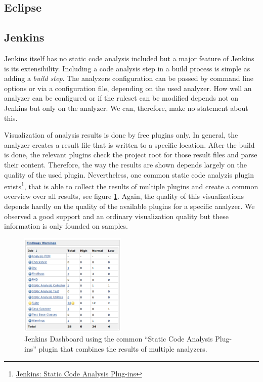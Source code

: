 \documentclass[conference]{IEEEtran}
\begin{document}
\subsection{Eclipse}
\label{subsec:evaluation_eclipse}

\subsection{Jenkins}
\label{subsec:evaluation_jenkins}
Jenkins itself has no static code analysis included but a major feature of Jenkins is its extensibility. Including a code analysis step in a build process is simple as adding a \textit{build step}. The analyzers configuration can be passed by command line options or via a configuration file, depending on the used analyzer. How well an analyzer can be configured or if the ruleset can be modified depends not on Jenkins but only on the analyzer. We can, therefore, make no statement about this.

Visualization of analysis results is done by free plugins only. In general, the analyzer creates a result file that is written to a specific location. After the build is done, the relevant plugins check the project root for those result files and parse their content. Therefore, the way the results are shown depends largely on the quality of the used plugin. Nevertheless, one common static code analyzis plugin exists\footnote{\href{https://wiki.jenkins-ci.org/display/JENKINS/Static+Code+Analysis+Plug-ins}{Jenkins: Static Code Analysis Plug-ins}}, that is able to collect the results of multiple plugins and create a common overview over all results, see figure \ref{fig:jenkins-dashboard}. Again, the quality of this visualizations depends hardly on the quality of the available plugins for a specific analyzer. We observed a good support and an ordinary visualization quality but these information is only founded on samples.

\begin{figure}[t]
	\centering
	\includegraphics[width=0.45\textwidth]{img/jenkins_dashboard.png}
	\caption{Jenkins Dashboard using the common ``Static Code Analysis Plug-ins'' plugin that combines the results of multiple analyzers.}
	\label{fig:jenkins-dashboard}
\end{figure}
\end{document}
